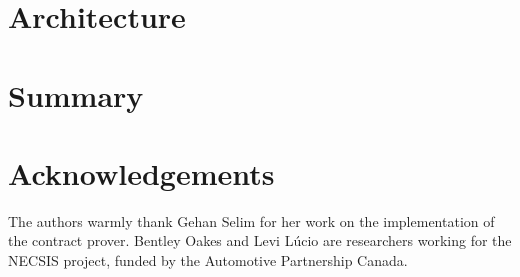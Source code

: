 \documentclass[conference]{IEEEtran}
\begin{document}
\section{Architecture}
\label{sec:arch}

%
%
%
%
%
%
%
%
%
%
\section{Summary}
\label{sec:conclusion}

\section*{Acknowledgements}
The authors warmly thank Gehan Selim for her work on the
implementation of the contract prover. Bentley Oakes and Levi L\'ucio are
researchers working for the NECSIS project, funded by the Automotive Partnership
Canada. %



\end{document}
